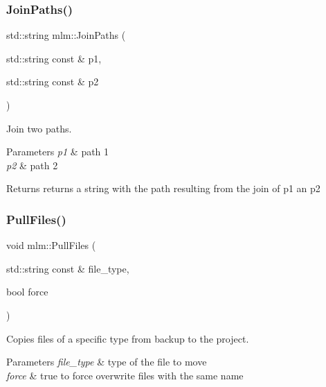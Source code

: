 \subsubsection{\texorpdfstring{Join\+Paths()}{JoinPaths()}}
{\footnotesize\ttfamily std\+::string mlm\+::\+Join\+Paths (\begin{DoxyParamCaption}\item[{std\+::string const \&}]{p1,  }\item[{std\+::string const \&}]{p2 }\end{DoxyParamCaption})}



Join two paths. 


\begin{DoxyParams}{Parameters}
{\em p1} & path 1 \\
\hline
{\em p2} & path 2 \\
\hline
\end{DoxyParams}
\begin{DoxyReturn}{Returns}
returns a string with the path resulting from the join of p1 an p2 
\end{DoxyReturn}
\mbox{\label{namespacemlm_adefd2b740c344e138a4615c47ac3bea4}} 
\subsubsection{\texorpdfstring{Pull\+Files()}{PullFiles()}}
{\footnotesize\ttfamily void mlm\+::\+Pull\+Files (\begin{DoxyParamCaption}\item[{std\+::string const \&}]{file\+\_\+type,  }\item[{bool}]{force }\end{DoxyParamCaption})}



Copies files of a specific type from backup to the project. 


\begin{DoxyParams}{Parameters}
{\em file\+\_\+type} & type of the file to move \\
\hline
{\em force} & true to force overwrite files with the same name \\
\hline
\end{DoxyParams}
\mbox{\label{namespacemlm_a5075bf9f5df7e45da6fd00e0927a2996}} 
